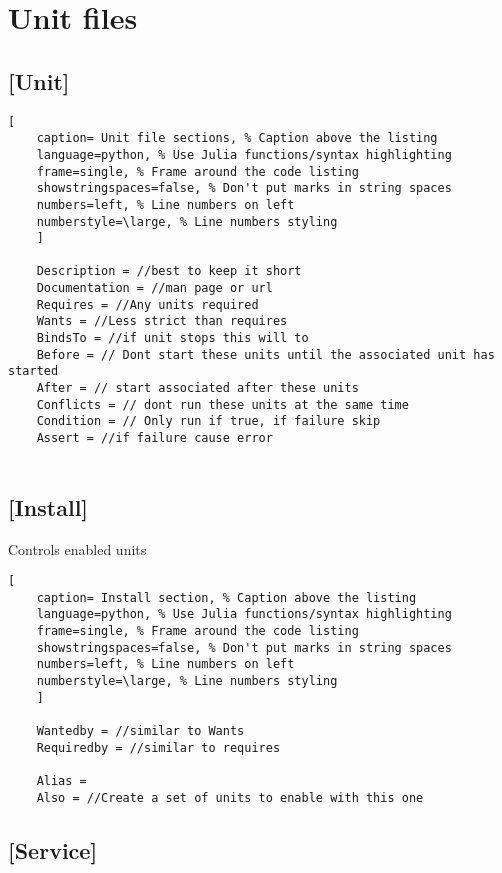 \documentclass[11pt]{scrartcl} %
\begin{document}
\section{Unit files}

\subsection{[Unit]}

\begin{lstlisting}[
	caption= Unit file sections, % Caption above the listing
	language=python, % Use Julia functions/syntax highlighting
	frame=single, % Frame around the code listing
	showstringspaces=false, % Don't put marks in string spaces
	numbers=left, % Line numbers on left
	numberstyle=\large, % Line numbers styling
	]

	Description = //best to keep it short
	Documentation = //man page or url
	Requires = //Any units required
	Wants = //Less strict than requires
	BindsTo = //if unit stops this will to
	Before = // Dont start these units until the associated unit has started
	After = // start associated after these units
	Conflicts = // dont run these units at the same time
	Condition = // Only run if true, if failure skip
	Assert = //if failure cause error
	
\end{lstlisting}

\subsection{[Install]}

Controls enabled units

\begin{lstlisting}[
	caption= Install section, % Caption above the listing
	language=python, % Use Julia functions/syntax highlighting
	frame=single, % Frame around the code listing
	showstringspaces=false, % Don't put marks in string spaces
	numbers=left, % Line numbers on left
	numberstyle=\large, % Line numbers styling
	]

	Wantedby = //similar to Wants
	Requiredby = //similar to requires

	Alias = 
	Also = //Create a set of units to enable with this one

\end{lstlisting}

\subsection{[Service]}
\end{document}
